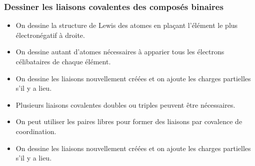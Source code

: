 \documentclass[
  11pt,
  a4paper,
  openany]{book}
\providecommand{\tightlist}{%
  \setlength{\itemsep}{0pt}\setlength{\parskip}{0pt}}
\begin{document}
\subsubsection{Dessiner les liaisons covalentes des composés binaires}\label{dessiner-les-liaisons-covalentes-des-composuxe9s-binaires}

\begin{itemize}
\tightlist
\item
  On dessine la structure de Lewis des atomes en plaçant l'élément le plus électronégatif à droite.
\item
  On dessine autant d'atomes nécessaires à apparier tous les électrons célibataires de chaque élément.
\item
  On dessine les liaisons nouvellement créées et on ajoute les charges partielles s'il y a lieu.
\item
  Plusieurs liaisons covalentes doubles ou triples peuvent être nécessaires.
\item
  On peut utiliser les paires libres pour former des liaisons par covalence de coordination.
\item
  On dessine les liaisons nouvellement créées et on ajoute les charges partielles s'il y a lieu.
\end{itemize}
\end{document}
